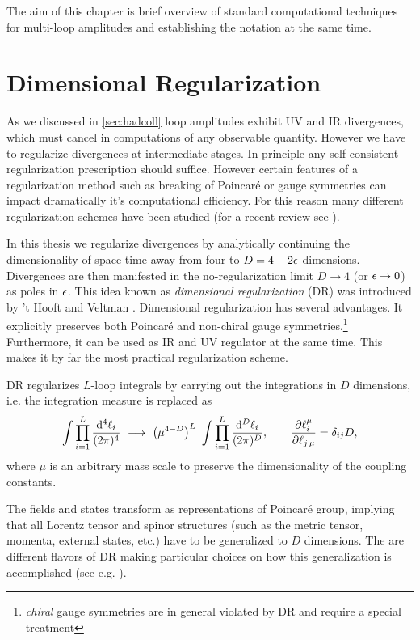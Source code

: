 The aim of this chapter is brief overview of standard computational techniques for multi-loop amplitudes and
establishing the notation at the same time.

\section{Dimensional Regularization}



As we discussed in \cref{sec:hadcoll} loop amplitudes exhibit UV and IR divergences,
which must cancel in computations of any observable quantity.
However we have to regularize divergences at intermediate stages.
In principle any self-consistent regularization prescription should suffice.
However certain features of a regularization method such as breaking of Poincaré or gauge symmetries
can impact dramatically it's computational efficiency.
For this reason many different regularization schemes have been studied (for a recent review see \cite{Gnendiger:2017pys}).

In this thesis we regularize divergences by analytically continuing the dimensionality of space-time away from four to $D = 4 - 2\epsilon$ dimensions.
Divergences are then manifested in the no-regularization limit $D\to4$ (or $\epsilon\to0$) as poles in $\epsilon$.
This idea known as \emph{dimensional regularization} (DR) was introduced by 't Hooft and Veltman \cite{tHooft:1972tcz}.
Dimensional regularization has several advantages.
It explicitly preserves both Poincaré and non-chiral gauge symmetries.\footnote{\emph{chiral} gauge symmetries are in general violated by DR and require a special treatment}
Furthermore, it can be used as IR and UV regulator at the same time.
This makes it by far the most practical regularization scheme.


DR regularizes $L$-loop integrals by carrying out the integrations in $D$ dimensions, i.e. the integration measure is replaced as
\begin{equation}
  \int \prod_{i=1}^{L} \frac{\dd[4]{\ell_i}}{(2\pi)^{4}} ~\longrightarrow~ \quantity(\mu^{4-D})^{L}~\int \prod_{i=1}^{L} \frac{\dd[D]{\ell_i}}{(2\pi)^{D}}, \qquad \pdv{\ell^\mu_i}{\ell_{j\,\mu}} = \delta_{i j} D,
  \label{eq:dimregmeasure}
\end{equation}
where $\mu$ is an arbitrary mass scale to preserve the dimensionality of the coupling constants.

The fields and states transform as representations of Poincaré group,
implying that all Lorentz tensor and spinor structures (such as the metric tensor, momenta, external states, etc.) have
to be generalized to $D$ dimensions.
The are different flavors of DR making particular choices on how this generalization is accomplished (see e.g. \cite{Gnendiger:2017pys}).

